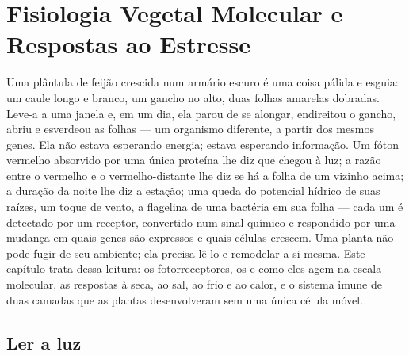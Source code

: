 \chapter{Fisiologia Vegetal Molecular e Respostas ao Estresse}\label{ch:b3:plant-molecular-physiology}

Uma plântula de feijão crescida num armário escuro é uma coisa pálida e
esguia: um caule longo e branco, um gancho no alto, duas folhas amarelas
dobradas. Leve-a a uma janela e, em um dia, ela parou de se alongar,
endireitou o gancho, abriu e esverdeou as folhas --- um organismo
diferente, a partir dos mesmos genes. Ela não estava esperando energia;
estava esperando informação. Um fóton vermelho absorvido por uma única
proteína lhe diz que chegou à luz; a razão entre o vermelho e o
vermelho-distante lhe diz se há a folha de um vizinho acima; a duração
da noite lhe diz a estação; uma queda do potencial hídrico de suas
raízes, um toque de vento, a flagelina de uma bactéria em sua folha ---
cada um é detectado por um receptor, convertido num sinal químico e
respondido por uma mudança em quais genes são expressos e quais células
crescem. Uma planta não pode fugir de seu ambiente; ela precisa lê-lo e
remodelar a si mesma. Este capítulo trata dessa leitura: os
fotorreceptores, os  e como eles agem na escala molecular, as
respostas à seca, ao sal, ao frio e ao calor, e o sistema imune de duas
camadas que as plantas desenvolveram sem uma única célula móvel.

\section{Ler a luz}

